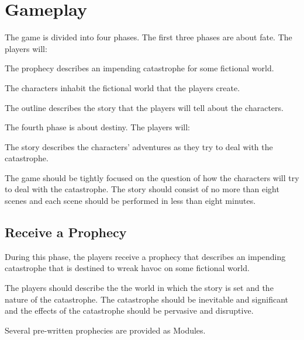 \documentclass[12pt, a5paper, parskip=half-]{scrartcl}
\begin{document}
\newpage

\section*{Gameplay}
The game is divided into four phases.
The first three phases are about fate.
The players will:
\begin{description}[labelindent=0.25cm, leftmargin=\widthof{\hspace{0.25cm}\textbullet\space}, font=\normalfont\textbullet\bfseries\cinzel\small\space]
  \item[Receive a Prophecy] The prophecy describes an impending catastrophe for some fictional world.
  \item[Create Characters] The characters inhabit the fictional world that the players create.
  \item[Write an Outline] The outline describes the story that the players will tell about the characters.
\end{description}

The fourth phase is about destiny.
The players will:
\begin{description}[labelindent=0.25cm, leftmargin=\widthof{\hspace{0.25cm}\textbullet\space}, font=\normalfont\textbullet\bfseries\cinzel\small\space]
	\item[Tell the Story] The story describes the characters' adventures as they try to deal with the catastrophe.
\end{description}

\bigskip

The game should be tightly focused on the question of how the characters will try to deal with the catastrophe.
The story should consist of no more than eight scenes and each scene should be performed in less than eight minutes. 

\subsection*{Receive a Prophecy}
During this phase, the players receive a prophecy that describes an impending catastrophe that is destined to wreak havoc on some fictional world.

The players should describe the the world in which the story is set and the nature of the catastrophe.
The catastrophe should be inevitable and significant and the effects of the catastrophe should be pervasive and disruptive.

Several pre-written  prophecies are provided as {\cinzel \small Modules}.
\end{document}
